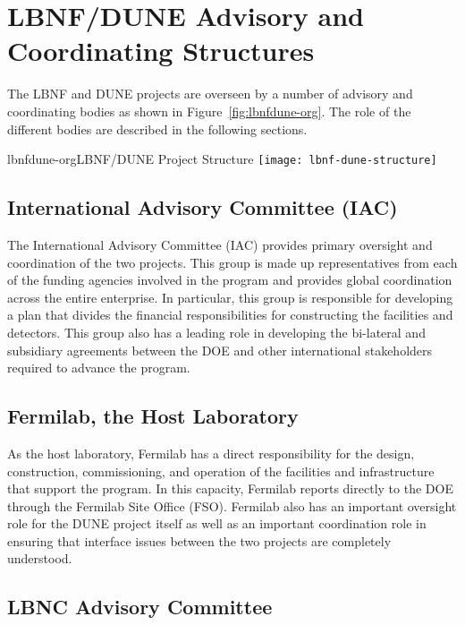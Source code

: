 \section{LBNF/DUNE Advisory and Coordinating Structures}
\label{sec:lbnf-dune-interface}

The LBNF and DUNE projects are overseen by a number of advisory and coordinating bodies as shown in Figure~\ref{fig:lbnfdune-org}.  The role of the different bodies are described in the following sections.  

\begin{cdrfigure}{lbnfdune-org}{LBNF/DUNE Project Structure}
\texttt{[image: lbnf-dune-structure]}
\end{cdrfigure}

\subsection{International Advisory Committee (IAC) }

The International Advisory Committee (IAC) provides primary oversight and coordination of the two projects.  This group is made up representatives from each of the funding agencies involved in the program and provides global coordination across the entire enterprise.  In particular, this group is responsible for developing a plan that divides the financial responsibilities for constructing the facilities and detectors.   This group also has a leading role in developing the bi-lateral and subsidiary agreements between the DOE and other international stakeholders required to advance the program. 

\subsection{Fermilab, the Host Laboratory}

As the host laboratory, Fermilab has a direct responsibility for the design, construction, commissioning, and operation of the facilities and infrastructure that support the program.  In this capacity, Fermilab reports directly to the    DOE through the Fermilab Site Office (FSO).   Fermilab also has an important oversight role for the DUNE project itself as well as an important coordination role in ensuring that interface issues between the two projects are completely understood. 

\subsection{LBNC Advisory Committee}

